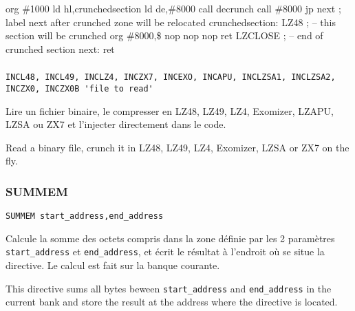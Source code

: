\begin{code}
  org \#1000
  ld hl,crunchedsection
  ld de,\#8000
  call decrunch
  call \#8000
  jp next         ; label next after crunched zone will be relocated
\medskip
  crunchedsection:
  LZ48            ; -- this section will be crunched
    org \#8000,\$
    nop
    nop
    nop
    ret
  LZCLOSE   ; -- end of crunched section
\medskip
  next:
    ret
\end{code}


\subsubsection{}

\begin{verbatim}
INCL48, INCL49, INCLZ4, INCZX7, INCEXO, INCAPU, INCLZSA1, INCLZSA2, INCZX0, INCZX0B 'file to read'
\end{verbatim}

\begin{xfr}
Lire un fichier binaire, le compresser en LZ48, LZ49, LZ4, Exomizer, LZAPU, LZSA ou ZX7 et l'injecter directement dans le code.
\end{xfr}

\begin{xen}
Read a binary file, crunch it in LZ48, LZ49, LZ4, Exomizer, LZSA or ZX7 on the fly.
\end{xen}

\subsubsection{SUMMEM}
\begin{verbatim}
SUMMEM start_address,end_address
\end{verbatim}
\begin{xfr}
  Calcule la somme des octets compris dans la zone définie par les 2 paramètres
  \texttt{start\_address} et \texttt{end\_address},
  et écrit le résultat à l'endroit où se situe la directive.
  Le calcul est fait sur la banque courante.
\end{xfr}

\begin{xen}
This directive sums all bytes beween \texttt{start\_address} and \texttt{end\_address} in the current bank
and store the result at the address where the directive is located.
\end{xen}


